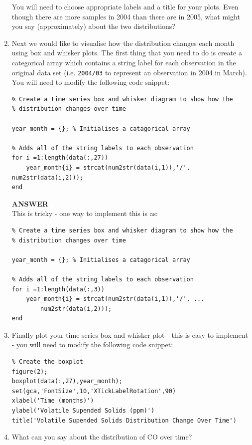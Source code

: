 \documentclass[12pt]{article}
\begin{document}
\begin{enumerate}
You will need to choose appropriate labels and a title for your plots. Even though there are more samples in 2004 than there are in 2005, what might you say (approximately) about the two distributions?

\item Next we would like to visualise how the distribution changes each month using box and whisker plots. The first thing that you need to do is create a categorical array which contains a string label for each observation in the original data set (i.e. \verb|2004/03| to represent an observation in 2004 in March). You will need to modify the following code snippet:
\vspace{-0.4cm}
\begin{lstlisting}
% Create a time series box and whisker diagram to show how the
% distribution changes over time

year_month = {}; % Initialises a catagorical array

% Adds all of the string labels to each observation
for i =1:length(data(:,27))
    year_month{i} = strcat(num2str(data(i,1)),'/', num2str(data(i,2)));
end
\end{lstlisting}

\begin{tcolorbox}
\textbf{ANSWER}\\

\vspace{-0.3cm}
This is tricky - one way to implement this is as:
\vspace{-0.4cm}
\begin{lstlisting}
% Create a time series box and whisker diagram to show how the
% distribution changes over time

year_month = {}; % Initialises a catagorical array

% Adds all of the string labels to each observation
for i =1:length(data(:,3))
    year_month{i} = strcat(num2str(data(i,1)),'/', ...
    	num2str(data(i,2)));
end
\end{lstlisting}
\end{tcolorbox}

\item Finally plot your time series box and whisker plot - this is easy to implement - you will need to modify the following code snippet:
\begin{lstlisting}
% Create the boxplot
figure(2);
boxplot(data(:,27),year_month);
set(gca,'FontSize',10,'XTickLabelRotation',90)
xlabel('Time (months)')
ylabel('Volatile Supended Solids (ppm)')
title('Volatile Supended Solids Distribution Change Over Time')
\end{lstlisting}

\item What can you say about the distribution of CO over time?
\end{enumerate}
\end{document}
